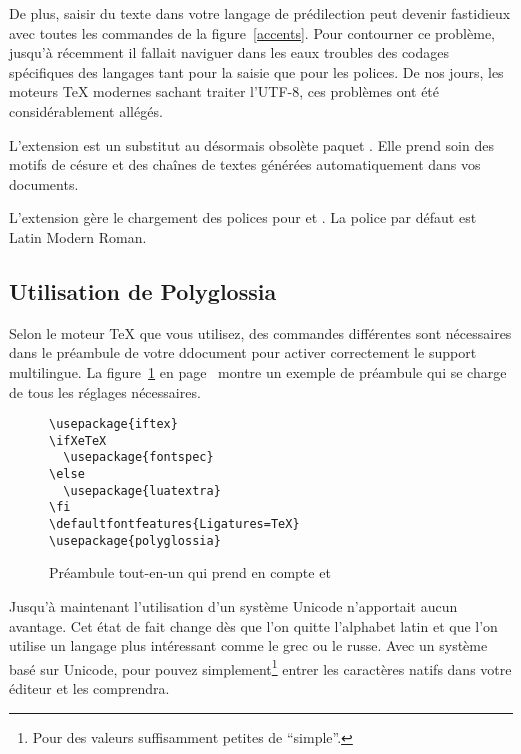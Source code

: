 De plus, saisir du texte dans votre langage de prédilection peut
devenir fastidieux avec toutes les commandes de la
figure~\ref{accents}. Pour contourner ce problème, jusqu'à récemment
il fallait naviguer dans les eaux troubles des codages spécifiques des
langages tant pour la saisie que pour les polices. De nos jours, les
moteurs \TeX{} modernes sachant traiter l'UTF-8, ces problèmes ont été
considérablement allégés.

L'extension \cite{polyglossia} est un substitut au désormais obsolète paquet
. Elle prend soin des motifs de césure et des chaînes de
textes générées automatiquement dans vos documents.

L'extension \cite{fontspec} gère le chargement des
polices pour  et . La police par défaut
est Latin Modern Roman.

\subsection{Utilisation de Polyglossia}

Selon le moteur \TeX{} que vous utilisez, des commandes différentes
sont nécessaires dans le préambule de votre ddocument pour activer
correctement le support multilingue.
La figure~\ref{allinone} en page~\pageref{allinone} montre un exemple
de préambule qui se charge de tous les réglages nécessaires.

\begin{figure}[!bp]
\begin{lined}{10cm}
\begin{verbatim}
\usepackage{iftex}
\ifXeTeX
  \usepackage{fontspec}
\else
  \usepackage{luatextra}
\fi
\defaultfontfeatures{Ligatures=TeX}
\usepackage{polyglossia}
\end{verbatim}
\end{lined}
\caption[Préambule tout-en-un]{Préambule tout-en-un qui prend en compte  et } \label{allinone}
\end{figure}


Jusqu'à maintenant l'utilisation d'un système  Unicode
n'apportait aucun avantage. Cet état de fait change dès que l'on
quitte l'alphabet latin et que l'on utilise un langage plus
intéressant comme le grec ou le russe. Avec un système basé sur
Unicode, pour pouvez simplement\footnote{Pour des valeurs suffisamment
  petites de \enquote{simple}.} entrer les caractères natifs dans votre éditeur
et  les comprendra.

